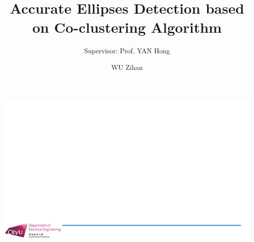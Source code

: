 \documentclass[aspectratio=169]{beamer}
\title{Accurate Ellipses Detection based on Co-clustering Algorithm}
\author{WU Zihan}
\subtitle{Supervisor: Prof. YAN Hong}
\begin{document}
{\includegraphics[width=\paperwidth]{EE8001 Presentation Template.pdf}} 
    \maketitle
\end{document}
